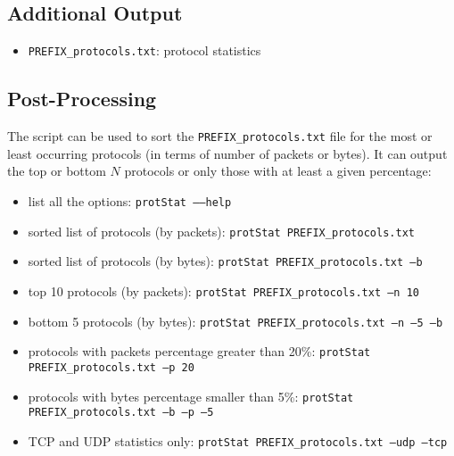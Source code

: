 \documentclass[documentation]{subfiles}
\begin{document}
\subsection{Additional Output}
\begin{itemize}
    \item {\tt PREFIX\_protocols.txt}: protocol statistics
\end{itemize}

\subsection{Post-Processing}
The {\tt{}} script can be used to sort the {\tt PREFIX\_protocols.txt} file for the most or least occurring protocols (in terms of number of packets or bytes).
It can output the top or bottom $N$ protocols or only those with at least a given percentage:
\begin{itemize}
    \item list all the options: {\tt protStat --{}--help}
    \item sorted list of protocols (by packets): {\tt protStat PREFIX\_protocols.txt}
    \item sorted list of protocols (by bytes): {\tt protStat PREFIX\_protocols.txt --b}
    \item top 10 protocols (by packets): {\tt protStat PREFIX\_protocols.txt --n 10}
    \item bottom 5 protocols (by bytes): {\tt protStat PREFIX\_protocols.txt --n --5 --b}
    \item protocols with packets percentage greater than 20\%: {\tt protStat PREFIX\_protocols.txt --p 20}
    \item protocols with bytes percentage smaller than 5\%: {\tt protStat PREFIX\_protocols.txt --b --p --5}
    \item TCP and UDP statistics only: {\tt protStat PREFIX\_protocols.txt --udp --tcp}
\end{itemize}
\end{document}
